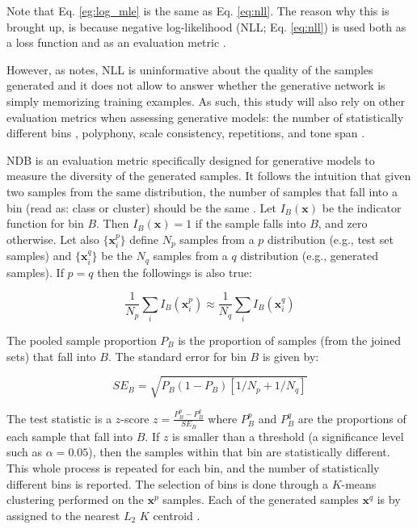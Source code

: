 \documentclass[a4paper]{book}
\begin{document}
Note that Eq. \ref{eg:log_mle} is the same as Eq. \ref{eq:nll}. The reason why this is brought up, is because negative log-likelihood (NLL; Eq. \ref{eq:nll}) is used both as a loss function and as an evaluation metric \parencite[also for generative models;][]{yu_seqgan_2016, borji_pros_2018}.

However, as \textcite{borji_pros_2018} notes, NLL is uninformative about the quality of the samples generated and it does not allow to answer whether the generative network is simply memorizing training examples. As such, this study will also rely on other evaluation metrics when assessing generative models: the number of statistically different bins \parencite[NDB;][]{richardson_gans_2018}, polyphony, scale consistency, repetitions, and tone span \parencite{mogren_c-rnn-gan_2016}.

NDB is an evaluation metric specifically designed for generative models to measure the diversity of the generated samples. It follows the intuition that given two samples from the same distribution, the number of samples that fall into a bin (read as: class or cluster) should be the same \parencite{richardson_gans_2018}. Let $I_B(\mathbf{x})$ be the indicator function for bin $B$. Then $I_B(\mathbf{x}) = 1$ if the sample falls into $B$, and zero otherwise. Let also $\{\mathbf{x}_i^p\}$ define $N_p$ samples from a $p$ distribution (e.g., test set samples) and $\{\mathbf{x}_i^q\}$ be the $N_q$ samples from a $q$ distribution (e.g., generated samples). If $p = q$ then the followings is also true:

\begin{equation}
    \frac{1}{N_p} \sum_i I_B(\mathbf{x}_i^p) \approx \frac{1}{N_q} \sum_i I_B(\mathbf{x}_i^q)
\end{equation}

The pooled sample proportion $P_B$ is the proportion of samples (from the joined sets) that fall into $B$. The standard error for bin $B$ is given by:

\begin{equation}
    SE_B = \sqrt{P_B (1 - P_B)[1 / N_p + 1 / N_q]}
\end{equation}

The test statistic is a $z$-score $z = \frac{P_B^p - P_B^q}{SE_B}$ where $P_B^p$ and $P_B^q$ are the proportions of each sample that fall into $B$. If $z$ is smaller than a threshold (a significance level such as $\alpha = 0.05$), then the samples within that bin are statistically different. This whole process is repeated for each bin, and the number of statistically different bins is reported. The selection of bins is done through a $K$-means clustering performed on the $\mathbf{x}^p$ samples. Each of the generated samples $\mathbf{x}^q$ is by assigned to the nearest $L_2$ $K$ centroid \parencite{richardson_gans_2018}.
\end{document}

